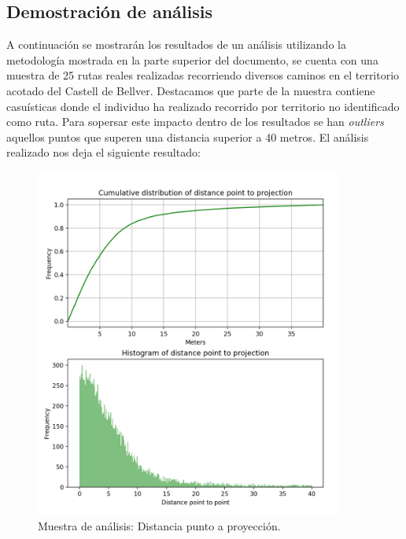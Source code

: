 \subsection{Demostración de análisis}
A continuación se mostrarán los resultados de un análisis utilizando la metodología mostrada en 
la parte superior del documento, se cuenta con una muestra de 25 rutas reales realizadas 
recorriendo diversos caminos en el territorio acotado del Castell de Bellver. Destacamos que parte 
de la muestra contiene casuísticas donde el individuo ha realizado recorrido por territorio no identificado 
como ruta. Para sopersar este impacto dentro de los resultados se han \textit{outliers} aquellos puntos 
que superen una distancia superior a 40 metros. El análisis realizado nos deja el siguiente resultado:
\begin{figure}[!htb]
\begin{minipage}{0.48\textwidth}
\centering
\includegraphics[width=0.9\textwidth]{./Imagenes/PointToProjection.png}
\caption{Muestra de análisis: Distancia punto a proyección.}
\label{figure:PointToProjection}
\end{minipage}\hfill
\begin{minipage}{0.48\textwidth}
\centering

\end{minipage}
\end{figure}
